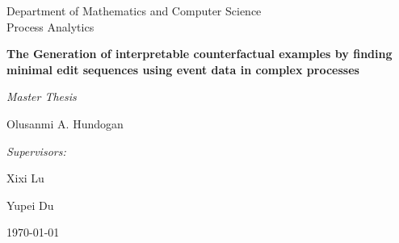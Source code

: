 \documentclass[./../paper.tex]{subfiles}
\begin{document}
\begin{titlepage}
    \centering
    Department of Mathematics and Computer Science\\
    Process Analytics

    \vspace{3cm}
    {\LARGE\textbf{The Generation of interpretable counterfactual examples by finding minimal edit sequences using event data in complex processes}}\par\vspace{0.5cm}
    {\large\textit{Master Thesis}}\par\vspace{1cm}
    {\large Olusanmi A. Hundogan}\par

    \vfill

    \emph{Supervisors:}\par
    Xixi Lu\par
    Yupei Du\par

    \today
    \vspace{2cm}


\end{titlepage}
\end{document}
